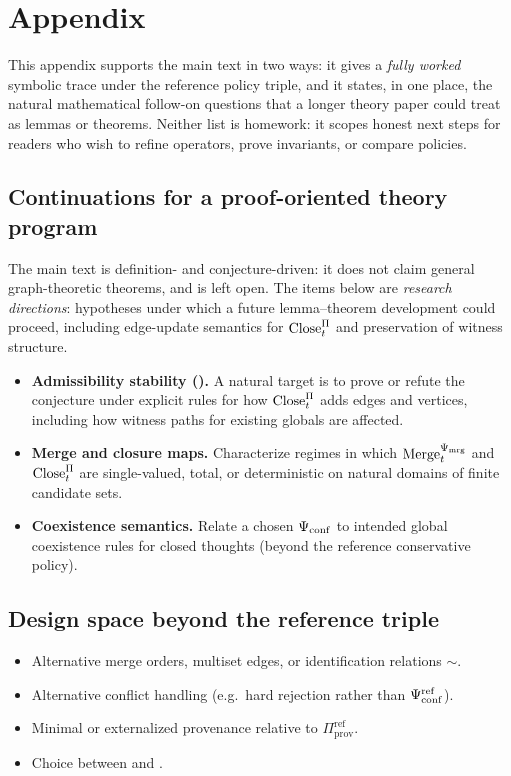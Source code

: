 \section{Appendix}
\label{app:notes}

This appendix supports the main text in two ways: it gives a \emph{fully worked} symbolic trace under the reference policy triple, and it states, in one place, the natural mathematical follow-on questions that a longer theory paper could treat as lemmas or theorems.
Neither list is homework: it scopes honest next steps for readers who wish to refine operators, prove invariants, or compare policies.



\subsection{Continuations for a proof-oriented theory program}
\label{app:proof-program}
The main text is definition- and conjecture-driven: it does not claim general graph-theoretic theorems, and  is left open.
The items below are \emph{research directions}: hypotheses under which a future lemma--theorem development could proceed, including edge-update semantics for $\mathrm{Close}_t^{\Pi}$ and preservation of witness structure.
\begin{itemize}[leftmargin=*]
  \item \textbf{Admissibility stability ().} A natural target is to prove or refute the conjecture under explicit rules for how $\mathrm{Close}_t^{\Pi}$ adds edges and vertices, including how witness paths for existing globals are affected.
  \item \textbf{Merge and closure maps.} Characterize regimes in which $\mathrm{Merge}_t^{\Psi_{\mathrm{mrg}}}$ and $\mathrm{Close}_t^{\Pi}$ are single-valued, total, or deterministic on natural domains of finite candidate sets.
  \item \textbf{Coexistence semantics.} Relate a chosen $\Psi_{\mathrm{conf}}$ to intended global coexistence rules for closed thoughts (beyond the reference conservative policy).
\end{itemize}

\subsection{Design space beyond the reference triple}
\label{app:policy-space}
\begin{itemize}[leftmargin=*]
  \item Alternative merge orders, multiset edges, or identification relations $\sim$.
  \item Alternative conflict handling (e.g.\ hard rejection rather than $\Psi_{\mathrm{conf}}^{\mathrm{ref}}$).
  \item Minimal or externalized provenance relative to $\Pi_{\mathrm{prov}}^{\mathrm{ref}}$.
  \item Choice between  and .
\end{itemize}

